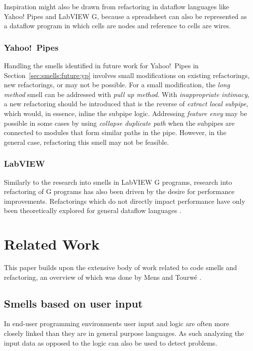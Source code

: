 \documentclass[10pt,conference,compsocconf]{IEEEtran}
\begin{document}
Inspiration might also be drawn from refactoring in dataflow languages like Yahoo! Pipes and LabVIEW G, because a spreadsheet can also be represented as a dataflow program in which cells are nodes and reference to cells are wires.

\subsubsection{Yahoo!\ Pipes}
Handling the smells identified in future work for Yahoo!\ Pipes in Section~\ref{sec:smells:future:yp} involves small modifications on existing refactorings, new refactorings, or may not be possible. For a small modification, the \emph{long method} smell can be addressed with \emph{pull up method}. 
With \emph{inappropriate intimacy}, a new refactoring should be introduced that is the reverse of \emph{extract local subpipe}, which would, in essence, inline the subpipe logic. 
Addressing \emph{feature envy} may be possible in some cases by using \emph{collapse duplicate path} when the subpipes are connected to modules that form similar paths in the pipe. However, in the general case, refactoring this smell may not be feasible. 


\subsubsection{LabVIEW}

Similarly to the research into smells in LabVIEW G programs, research into refactoring of G programs has also been driven by the desire for performance improvements. Refactorings which do not directly impact performance have only been theoretically explored for general dataflow languages \cite{sui2008automated}.

\section{Related Work}
\label{sec:related_work}

This paper builds upon the extensive body of work related to code smells and refactoring, an overview of which was done by Mens and Tourw\'{e} \cite{mens2004survey1}.

\subsection{Smells based on user input}
\label{subsec:related_datasmells}
In end-user programming environments user input and logic are often more closely linked than they are in general purpose languages.
As such analyzing the input data as opposed to the logic can also be used to detect problems.
\end{document}
